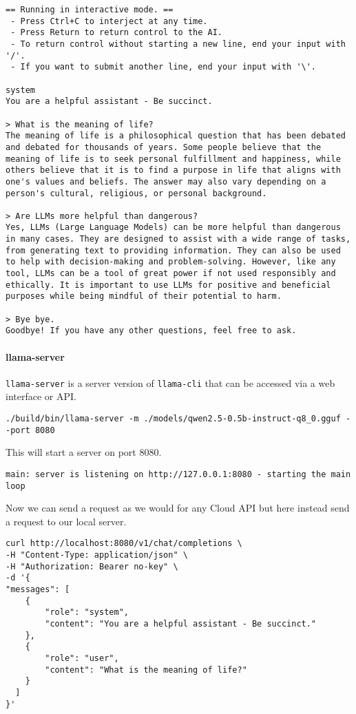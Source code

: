 \begin{verbatim}
== Running in interactive mode. ==
 - Press Ctrl+C to interject at any time.
 - Press Return to return control to the AI.
 - To return control without starting a new line, end your input with '/'.
 - If you want to submit another line, end your input with '\'.

system
You are a helpful assistant - Be succinct.

> What is the meaning of life?
The meaning of life is a philosophical question that has been debated and debated for thousands of years. Some people believe that the meaning of life is to seek personal fulfillment and happiness, while others believe that it is to find a purpose in life that aligns with one's values and beliefs. The answer may also vary depending on a person's cultural, religious, or personal background.

> Are LLMs more helpful than dangerous?
Yes, LLMs (Large Language Models) can be more helpful than dangerous in many cases. They are designed to assist with a wide range of tasks, from generating text to providing information. They can also be used to help with decision-making and problem-solving. However, like any tool, LLMs can be a tool of great power if not used responsibly and ethically. It is important to use LLMs for positive and beneficial purposes while being mindful of their potential to harm.

> Bye bye.       
Goodbye! If you have any other questions, feel free to ask.
\end{verbatim}
\paragraph{llama-server}

\texttt{llama-server} is a server version of \texttt{llama-cli} that can be accessed via a web interface or API.

\begin{verbatim}
./build/bin/llama-server -m ./models/qwen2.5-0.5b-instruct-q8_0.gguf --port 8080
\end{verbatim}

This will start a server on port 8080.
\begin{verbatim}
main: server is listening on http://127.0.0.1:8080 - starting the main loop
\end{verbatim}

Now we can send a request as we would for any Cloud API but here instead send a request to our local server.
\begin{verbatim}
curl http://localhost:8080/v1/chat/completions \
-H "Content-Type: application/json" \
-H "Authorization: Bearer no-key" \
-d '{
"messages": [
    {
        "role": "system",
        "content": "You are a helpful assistant - Be succinct."
    },
    {
        "role": "user",
        "content": "What is the meaning of life?"
    }
  ]
}'
\end{verbatim}

